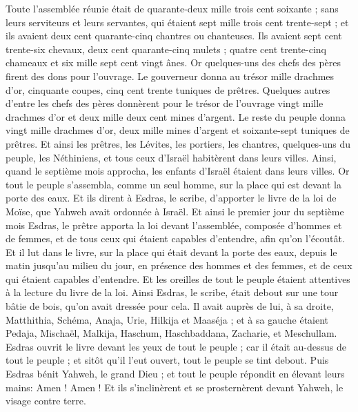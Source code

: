 \begin{multicols}{2}
Toute l'assemblée réunie était de quarante-deux mille trois cent soixante ;
sans leurs serviteurs et leurs servantes, qui étaient sept mille trois cent trente-sept ; et ils avaient deux cent quarante-cinq chantres ou chanteuses.
Ils avaient sept cent trente-six chevaux, deux cent quarante-cinq mulets ;
quatre cent trente-cinq chameaux et six mille sept cent vingt ânes.
Or quelques-uns des chefs des pères firent des dons pour l'ouvrage. Le gouverneur donna au trésor mille drachmes d'or, cinquante coupes, cinq cent trente tuniques de prêtres.
Quelques autres d'entre les chefs des pères donnèrent pour le trésor de l'ouvrage vingt mille drachmes d'or et deux mille deux cent mines d'argent.
Le reste du peuple donna vingt mille drachmes d'or, deux mille mines d'argent et soixante-sept tuniques de prêtres.
Et ainsi les prêtres, les Lévites, les portiers, les chantres, quelques-uns du peuple, les Néthiniens, et tous ceux d'Israël habitèrent dans leurs villes. Ainsi, quand le septième mois approcha, les enfants d'Israël étaient dans leurs villes.
\VerseOne{}Or tout le peuple s'assembla, comme un seul homme, sur la place qui est devant la porte des eaux. Et ils dirent à Esdras, le scribe, d'apporter le livre de la loi de Moïse, que Yahweh avait ordonnée à Israël.
Et ainsi le premier jour du septième mois Esdras, le prêtre apporta la loi devant l'assemblée, composée d'hommes et de femmes, et de tous ceux qui étaient capables d'entendre, afin qu'on l'écoutât.
Et il lut dans le livre, sur la place qui était devant la porte des eaux, depuis le matin jusqu'au milieu du jour, en présence des hommes et des femmes, et de ceux qui étaient capables d'entendre. Et les oreilles de tout le peuple étaient attentives à la lecture du livre de la loi.
Ainsi Esdras, le scribe, était debout sur une tour bâtie de bois, qu'on avait dressée pour cela. Il avait auprès de lui, à sa droite, Matthithia, Schéma, Anaja, Urie, Hilkija et Maaséja ; et à sa gauche étaient Pedaja, Mischaël, Malkija, Haschum, Haschbaddana, Zacharie, et Meschullam.
Esdras ouvrit le livre devant les yeux de tout le peuple ; car il était au-dessus de tout le peuple ; et sitôt qu'il l'eut ouvert, tout le peuple se tint debout.
Puis Esdras bénit Yahweh, le grand Dieu ; et tout le peuple répondit en élevant leurs mains: Amen ! Amen ! Et ils s'inclinèrent et se prosternèrent devant Yahweh, le visage contre terre.

\end{multicols}
